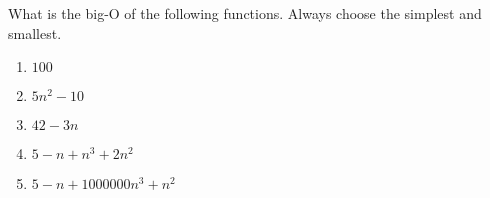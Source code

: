 What is the big-O of the following functions.
Always choose the simplest and smallest.
\begin{enumerate}[nosep, label=(\alph*)]
  \item $100$
  \item $5n^2 - 10$
  \item $42 - 3n$
  \item $5 - n + n^3 + 2n^2$
  \item $5 - n + 1000000n^3 + n^2$
\end{enumerate}
